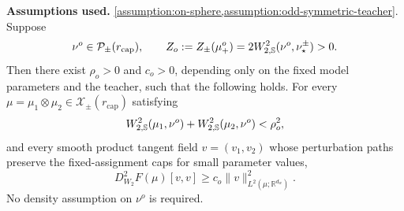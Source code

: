 \begin{proposition}
\label{prop:Mplus-teacher-local-positive-curvature}
\textbf{Assumptions used.}
\cref{assumption:on-sphere,assumption:odd-symmetric-teacher}.
Suppose
\[
 \nu^o\in\mathcal P_\pm(r_{\mathrm{cap}}),
 \qquad
 Z_o:=Z_\pm(\mu_+^o)
 =2W_{2,\mathbb{S}}^2(\nu^o,\nu_\star^\pm)>0.
\]
Then there exist \(\rho_o>0\) and \(c_o>0\), depending only on the fixed
model parameters and the teacher, such that the following holds. For every
\(\mu=\mu_1\otimes\mu_2\in\mathcal X_\pm(r_{\mathrm{cap}})\) satisfying
\[
 W_{2,\mathbb{S}}^2(\mu_1,\nu^o)
 +W_{2,\mathbb{S}}^2(\mu_2,\nu^o)<\rho_o^2,
\]
and every smooth product tangent field \(v=(v_1,v_2)\) whose perturbation
paths preserve the fixed-assignment caps for small parameter values,
\begin{equation}
\label{eq:mf-teacher-local-positive-curvature}
 D_{W_2}^2F(\mu)[v,v]
 \ge c_o\|v\|_{L^2(\mu;\mathbb R^{d_w})}^2.
\end{equation}
No density assumption on \(\nu^o\) is required.
\end{proposition}


